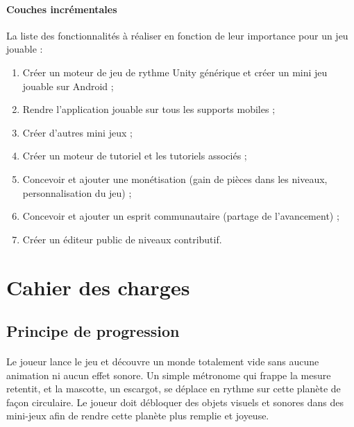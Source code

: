\paragraph{Couches incrémentales}
La liste des fonctionnalités à réaliser en fonction de leur importance pour un jeu jouable :
\begin{enumerate}
\item Créer un moteur de jeu de rythme Unity générique et créer un mini jeu jouable sur Android ;
\item Rendre l’application jouable sur tous les supports mobiles ;
\item Créer d’autres mini jeux ;
\item Créer un moteur de tutoriel et les tutoriels associés ;
\item Concevoir et ajouter une monétisation (gain de pièces dans les niveaux, personnalisation du jeu) ;
\item Concevoir et ajouter un esprit communautaire (partage de l’avancement) ;
\item Créer un éditeur public de niveaux contributif.
\end{enumerate}


\section{Cahier des charges}

\subsection{Principe de progression}
\paragraph{} Le joueur lance le jeu et découvre un monde totalement vide sans aucune animation ni aucun effet sonore. Un simple métronome qui frappe la mesure retentit, et la mascotte, un escargot, se déplace en rythme sur cette planète de façon circulaire.
Le joueur doit débloquer des objets visuels et sonores dans des mini-jeux afin de rendre cette planète plus remplie et joyeuse.

